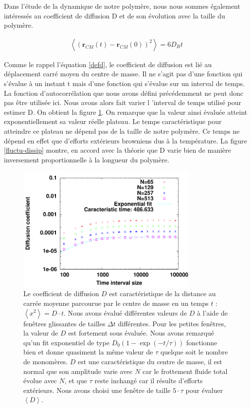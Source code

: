 Dans l'étude de la dynamique de notre polymère, nous nous sommes également intéressés au coefficient de diffusion D et de son évolution avec la taille du polymère.

\begin{eqnarray}
\left<(\textbf{r}_{CM}(t)-\textbf{r}_{CM}(0))^2\right>= 6 D_R t
\label{defd}
\end{eqnarray}

Comme le rappel l'équation \ref{defd}, le coefficient de diffusion est lié au déplacement carré moyen du centre de masse. Il ne s'agit pas d'une fonction qui s'évalue à un instant t mais d'une fonction qui s'évalue sur un interval de temps. La fonction d'autocorrélation que nous avons défini précédemment ne peut donc pas être utilisée ici. Nous avons alors fait varier l 'interval de temps utilisé pour estimer D. On obtient la figure \ref{dexptime}. On remarque que la valeur ainsi évaluée atteint exponentiellement sa valeur réelle plateau. Le temps caractéristique pour atteindre ce plateau ne dépend pas de la taille de notre polymère. Ce temps ne dépend en effet que d'efforts extérieurs browniens dus à la température. La figure \ref{fluctu-dissip} montre, en accord avec la théorie que D varie bien de manière inversement proportionnelle à la longueur du polymère.

\begin{figure}[H]
\begin{center}
\includegraphics[width=0.8\textwidth]{dexptime.pdf}

\caption[Résultats numériques: estimation du coefficient de diffusion]{Le coefficient de diffusion $D$ est caractéristique de la distance au carrée moyenne parcourue par le centre de masse en un temps $t$ : $\left<x^2\right> =D\cdot t$. Nous avons évalué différentes valeurs de $D$ à l'aide de fenêtres glissantes de tailles $\Delta t$ différentes. Pour les petites fenêtres, la valeur de $D$ est fortement sous évaluée. Nous avons remarqué qu'un fit exponentiel de type $D_0\left(1-\exp\left(-t/\tau\right)\right)$ fonctionne bien et donne quasiment la même valeur de $\tau$ quelque soit le nombre de monomères. $D$ est une caractéristique du centre de masse, il est normal que son amplitude varie avec $N$ car le frottement fluide total évolue avec $N$, et que $\tau$ reste inchangé car il résulte d’efforts extérieurs. Nous avons choisi une fenêtre de taille $5\cdot \tau$ pour évaluer $\left<D\right> $.}
\label{dexptime}
\end{center}
\end{figure}

